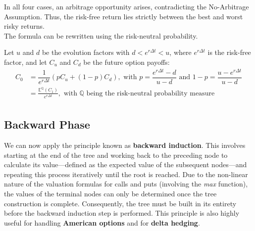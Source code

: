 In all four cases, an arbitrage opportunity arises, contradicting the No-Arbitrage Assumption. Thus, the risk-free return lies strictly between the best and worst risky returns. \\
The formula can be rewritten using the risk-neutral probability. \\

\begin{definitionbox}[frametitle = {Risk-neutral valuation formula}]
    Let $u$ and $d$ be the evolution factors with $d < e^{r \Delta t} < u$, where $e^{r \Delta t}$ is the risk-free factor, and let $C_u$ and $C_d$ be the future option payoffs:
    \begin{align*}
        C_0&=\dfrac{1}{e^{r \Delta t}}(pC_u+(1-p)C_d), \text{ with } p=\dfrac{e^{r \Delta t}-d}{u-d} \text{ and } 1-p = \dfrac{u-e^{r \Delta t}}{u-d} \\
        &=\frac{\mathbb{E}^{\mathbb{Q}}(C_1)}{e^{r \Delta t}}, \text{ with } \mathbb{Q} \text{ being the risk-neutral probability measure} \\
    \end{align*}
\end{definitionbox}

\subsection{Backward Phase}
We can now apply the principle known as \textbf{backward induction}. 
This involves starting at the end of the tree and working back to the preceding node to calculate its value—defined as the expected value of the subsequent nodes—and repeating this process iteratively until the root is reached. 
Due to the non-linear nature of the valuation formulas for calls and puts (involving the \textit{max} function), the values of the terminal nodes can only be determined once the tree construction is complete. 
Consequently, the tree must be built in its entirety before the backward induction step is performed. 
This principle is also highly useful for handling \textbf{American options} and for \textbf{delta hedging}.
\vspace{0.25cm}

